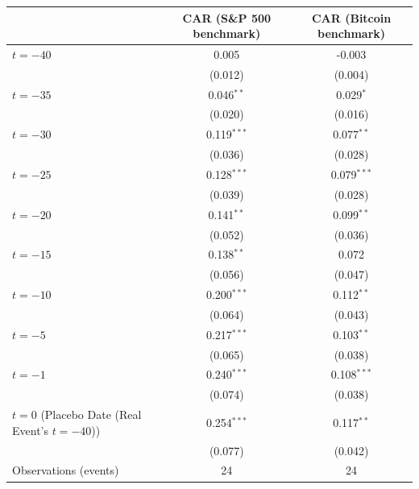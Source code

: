 \begin{tabular}{lcc}
\toprule
 & CAR (S\&P 500 benchmark) & CAR (Bitcoin benchmark) \\
\midrule
\quad $t=-40$ & 0.005 & -0.003 \\
 & (0.012) & (0.004) \\
\quad $t=-35$ & 0.046$^{**}$ & 0.029$^{*}$ \\
 & (0.020) & (0.016) \\
\quad $t=-30$ & 0.119$^{***}$ & 0.077$^{**}$ \\
 & (0.036) & (0.028) \\
\quad $t=-25$ & 0.128$^{***}$ & 0.079$^{***}$ \\
 & (0.039) & (0.028) \\
\quad $t=-20$ & 0.141$^{**}$ & 0.099$^{**}$ \\
 & (0.052) & (0.036) \\
\quad $t=-15$ & 0.138$^{**}$ & 0.072 \\
 & (0.056) & (0.047) \\
\quad $t=-10$ & 0.200$^{***}$ & 0.112$^{**}$ \\
 & (0.064) & (0.043) \\
\quad $t=-5$ & 0.217$^{***}$ & 0.103$^{**}$ \\
 & (0.065) & (0.038) \\
\quad $t=-1$ & 0.240$^{***}$ & 0.108$^{***}$ \\
 & (0.074) & (0.038) \\
\quad $t=0$ (Placebo Date (Real Event's $t=-40$)) & 0.254$^{***}$ & 0.117$^{**}$ \\
 & (0.077) & (0.042) \\
\midrule
Observations (events) & 24 & 24 \\
\bottomrule
\end{tabular}
